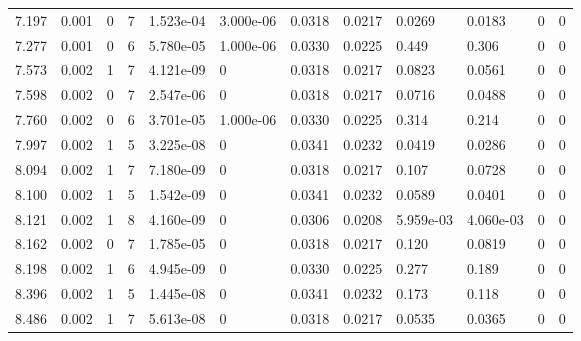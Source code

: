 \documentclass[preview]{standalone}
\begin{document}
{{{\begin{tabular}{L{1.2cm}C{1.2cm} C{0.3cm}C{0.5cm} C{1.4cm}C{1.4cm} C{1.4cm}C{1.4cm} C{1.6cm}C{1.6cm} C{1.6cm}C{1.6cm}}
  7.197  &  0.001  & 0     &  7 &  1.523e-04  & 3.000e-06  &  0.0318&   0.0217& 0.0269 & 0.0183   &  0 & 0  \\ 
  7.277  &  0.001  & 0     &  6 &  5.780e-05  & 1.000e-06  &  0.0330&   0.0225& 0.449 & 0.306   &  0 & 0  \\ 
  7.573  &  0.002  & 1     &  7 &  4.121e-09  & 0  &  0.0318&   0.0217& 0.0823 & 0.0561   &  0 & 0  \\ 
  7.598  &  0.002  & 0     &  7 &  2.547e-06  & 0  &  0.0318&   0.0217& 0.0716 & 0.0488   &  0 & 0  \\ 
  7.760  &  0.002  & 0     &  6 &  3.701e-05  & 1.000e-06  &  0.0330&   0.0225& 0.314 & 0.214   &  0 & 0  \\ 
  7.997  &  0.002  & 1     &  5 &  3.225e-08  & 0  &  0.0341&   0.0232& 0.0419 & 0.0286   &  0 & 0  \\ 
  8.094  &  0.002  & 1     &  7 &  7.180e-09  & 0  &  0.0318&   0.0217& 0.107 & 0.0728   &  0 & 0  \\ 
  8.100  &  0.002  & 1     &  5 &  1.542e-09  & 0  &  0.0341&   0.0232& 0.0589 & 0.0401   &  0 & 0  \\ 
  8.121  &  0.002  & 1     &  8 &  4.160e-09  & 0  &  0.0306&   0.0208& 5.959e-03 & 4.060e-03   &  0 & 0  \\ 
  8.162  &  0.002  & 0     &  7 &  1.785e-05  & 0  &  0.0318&   0.0217& 0.120 & 0.0819   &  0 & 0  \\ 
  8.198  &  0.002  & 1     &  6 &  4.945e-09  & 0  &  0.0330&   0.0225& 0.277 & 0.189   &  0 & 0  \\ 
  8.396  &  0.002  & 1     &  5 &  1.445e-08  & 0  &  0.0341&   0.0232& 0.173 & 0.118   &  0 & 0  \\ 
  8.486  &  0.002  & 1     &  7 &  5.613e-08  & 0  &  0.0318&   0.0217& 0.0535 & 0.0365   &  0 & 0  \\ 
\hline 
\end{tabular} 

}}}
\end{document}

